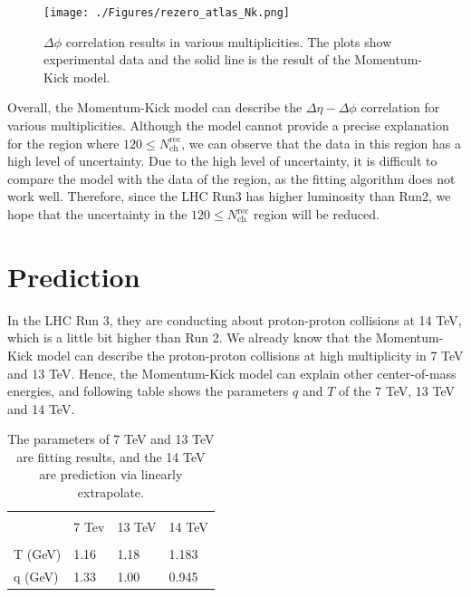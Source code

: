 \documentclass[jkps,fleqn,showpacs,showkeys]{revtex4}
\begin{document}
\begin{figure}[ht]
\centering
\texttt{[image: ./Figures/rezero\_atlas\_Nk.png]}
\caption{$\Delta \phi$ correlation results in various multiplicities.
The plots show experimental data and the solid line is the result of the Momentum-Kick model.
}
\label{figure:variousmulti}
\end{figure}

Overall, the Momentum-Kick model can describe the $\Delta\eta - \Delta\phi$ correlation for various multiplicities.
Although the model cannot provide a precise explanation for the region where $120\leq N_{\text{ch}}^{\text{rec}}$, we can observe that the data in this region has a high level of uncertainty.
Due to the high level of uncertainty, it is difficult to compare the model with the data of the region, as the fitting algorithm does not work well.
Therefore, since the LHC Run3 has higher luminosity than Run2, we hope that the uncertainty in the $120\leq N_{\text{ch}}^{\text{rec}}$ region will be reduced.



\section*{Prediction}
\label{sec:Prediction}

In the LHC Run 3, they are conducting about proton-proton collisions at 14 TeV, which is a little bit higher than Run 2.
We already know that the Momentum-Kick model can describe the proton-proton collisions at high multiplicity in 7 TeV and 13 TeV.
Hence, the Momentum-Kick model can explain other center-of-mass energies, and following table shows the parameters $q$ and $T$ of the 7 TeV, 13 TeV and 14 TeV.

\begin{table}[ht]
  \centering
  \begin{tabular}{C{2cm} | C{3cm}  C{4cm}  C{2.5cm} }
   \hline \\[-1 ex]
    & 7 Tev & 13 TeV & 14 TeV \\ [1 ex] \hline\hline \\[-1.5 ex]
   T (GeV) & 1.16 & 1.18 & 1.183 \\[1ex]
   q (GeV) & 1.33 & 1.00 & 0.945 \\ [1ex]
   \hline
 \end{tabular}
 \caption{The parameters of 7 TeV and 13 TeV are fitting results, and the 14 TeV are prediction via linearly extrapolate.}
 \label{table:predict}
\end{table}
\end{document}
